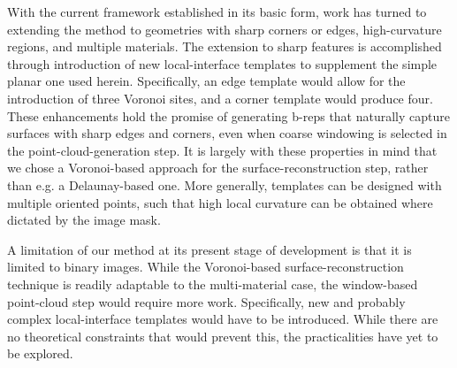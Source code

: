 With the current framework established in its basic form, work has turned to extending the method to geometries with sharp corners or edges, high-curvature regions, and multiple materials.  The extension to sharp features is accomplished through introduction of new local-interface templates to supplement the simple planar one used herein.  Specifically, an edge template would allow for the introduction of three Voronoi sites, and a corner template would produce four. These enhancements hold the promise of generating b-reps that naturally capture surfaces with sharp edges and corners, even when coarse windowing is selected in the point-cloud-generation step.  It is largely with these properties in mind that we chose a Voronoi-based approach for the surface-reconstruction step, rather than e.g. a Delaunay-based one.   More generally, templates can be designed with multiple oriented points, such that high local curvature can be obtained where dictated by the image mask.  

A limitation of our method at its present stage of development is that it is limited to binary images.  While the Voronoi-based surface-reconstruction technique is readily adaptable to the multi-material case, the window-based point-cloud step would require more work.  Specifically, new and probably complex local-interface templates would have to be introduced.  While there are no theoretical constraints that would prevent this, the practicalities have yet to be explored.